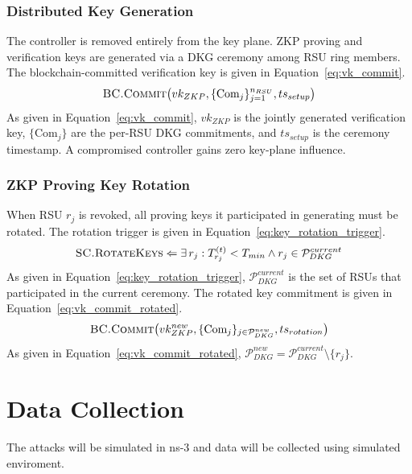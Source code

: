 \documentclass[12pt, a4paper]{report}
\begin{document}
{{\subsubsection{Distributed Key Generation}
The controller is removed entirely from the key plane.
\ac{ZKP} proving and verification keys are generated via
a \ac{DKG} ceremony among \ac{RSU} ring members. The
blockchain-committed verification key is given in
Equation~\eqref{eq:vk_commit}.
\begin{equation}
\textsc{BC.Commit}\!\left(vk_{ZKP},
\{\text{Com}_j\}_{j=1}^{n_{RSU}},
ts_{setup}\right)
\label{eq:vk_commit}
\end{equation}
As given in Equation~\eqref{eq:vk_commit}, $vk_{ZKP}$
is the jointly generated verification key,
$\{\text{Com}_j\}$ are the per-\ac{RSU} \ac{DKG}
commitments, and $ts_{setup}$ is the ceremony timestamp.
A compromised controller gains zero key-plane influence.



\subsubsection{ZKP Proving Key Rotation}
When \ac{RSU} $r_j$ is revoked, all proving keys it
participated in generating must be rotated. The rotation
trigger is given in
Equation~\eqref{eq:key_rotation_trigger}.
\begin{equation}
\textsc{SC.RotateKeys}\Leftarrow
\exists\,r_j:T_{r_j}^{(t)}<T_{min}
\land r_j\in\mathcal{P}_{DKG}^{current}
\label{eq:key_rotation_trigger}
\end{equation}
As given in Equation~\eqref{eq:key_rotation_trigger},
$\mathcal{P}_{DKG}^{current}$ is the set of \ac{RSU}s
that participated in the current ceremony. The rotated
key commitment is given in
Equation~\eqref{eq:vk_commit_rotated}.
\begin{equation}
\textsc{BC.Commit}\!\left(vk_{ZKP}^{new},
\{\text{Com}_j\}_{j\in\mathcal{P}_{DKG}^{new}},
ts_{rotation}\right)
\label{eq:vk_commit_rotated}
\end{equation}
As given in Equation~\eqref{eq:vk_commit_rotated},
$\mathcal{P}_{DKG}^{new}{=}
\mathcal{P}_{DKG}^{current}\setminus\{r_j\}$.










\section{Data Collection}
The attacks will be simulated in ns-3 and data will be collected using simulated enviroment.



}}
\end{document}
